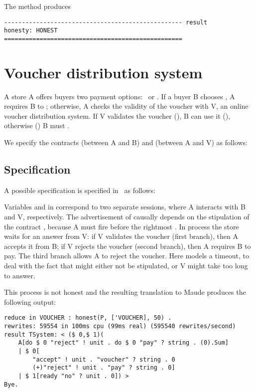 The method  produces
\begin{lstlisting}
-------------------------------------------------- result
honesty: HONEST
==================================================
\end{lstlisting}

\section{Voucher distribution system}
A store {\pmv A} offers buyers two payment options: \cp\ or \cv.
%
If a buyer {\pmv B} chooses \cp, {\pmv A} requires {\pmv B} to \p;
otherwise, {\pmv A} checks the validity of the voucher with {\pmv V}, an
online voucher distribution system.
%
If {\pmv V} validates the voucher (), {\pmv B} can use it (\vou),
otherwise () {\pmv B} must \p.

We specify the contracts  (between {\pmv A} and {\pmv B}) 
and  (between {\pmv A} and {\pmv V}) 
as follows:

\subsection{Specification}\label{sec:uses:dishonest-voucher}
A possible specification is specified in~\cite{BTZ12coordination} as follows:

Variables  and  in  correspond to two separate
sessions, where {\pmv A} interacts with {\pmv B} and {\pmv V}, respectively.
The advertisement of  causally depends on the
stipulation of the contract , 
because {\pmv A} must fire  before the rightmost .
%
In process  the store waits for an answer from {\pmv V}:
if {\pmv V} validates the voucher (first branch), 
then {\pmv A} accepts it from {\pmv B};
if {\pmv V} rejects the voucher (second branch), 
then {\pmv A} requires {\pmv B} to pay.
The third branch  allows {\pmv A} to reject the voucher.
Here  models a timeout, 
to deal with the fact that  might either 
not be stipulated, or {\pmv V} might take too long to answer.

This process is not honest \cite{verifiable} and the resulting translation to Maude produces the following output:
\begin{lstlisting}
reduce in VOUCHER : honest(P, ['VOUCHER], 50) .
rewrites: 59554 in 100ms cpu (99ms real) (595540 rewrites/second)
result TSystem: < ($ 0,$ 1)(
    A[do $ 0 "reject" ! unit . do $ 0 "pay" ? string . (0).Sum]
    | $ 0[
        "accept" ! unit . "voucher" ? string . 0
        (+)"reject" ! unit . "pay" ? string . 0] 
    | $ 1[ready "no" ? unit . 0]) >
Bye.
\end{lstlisting}

